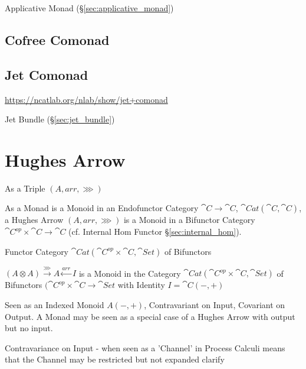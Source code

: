 Applicative Monad (\S\ref{sec:applicative_monad})



\subsection{Cofree Comonad}\label{sec:cofree_comonad}

\subsection{Jet Comonad}\label{sec:jet_comonad}

\url{https://ncatlab.org/nlab/show/jet+comonad}

\fist Jet Bundle (\S\ref{sec:jet_bundle})



\section{Hughes Arrow}\label{sec:hughes_arrow}

As a Triple $(A, arr, \ggg)$

As a Monad is a Monoid in an Endofunctor Category $\cat{C} \rightarrow
\cat{C}$, $\cat{Cat}(\cat{C},\cat{C})$, a Hughes Arrow $(A, arr,
\ggg)$ is a Monoid in a Bifunctor Category $\cat{C}^{op} \times
\cat{C} \rightarrow \cat{C}$ (cf. Internal Hom Functor
\S\ref{sec:internal_hom}).

Functor Category $\cat{Cat}(\cat{C}^{op} \times \cat{C},
\cat{Set})$ of Bifunctors

$(A \otimes A) \xrightarrow{\ggg} A \xleftarrow{arr} I$ is a Monoid in
the Category $\cat{Cat} (\cat{C}^{op} \times \cat{C}, \cat{Set})$ of
Bifunctors $(\cat{C}^{op} \times \cat{C} \rightarrow \cat{Set}$ with
Identity $I = \cat{C} (-,+)$

Seen as an Indexed Monoid $A(-,+)$, Contravariant on Input, Covariant
on Output. A Monad may be seen as a special case of a Hughes Arrow
with output but no input.

Contravariance on Input - when seen as a 'Channel' in Process Calculi
means that the Channel may be restricted but not expanded %
clarify

